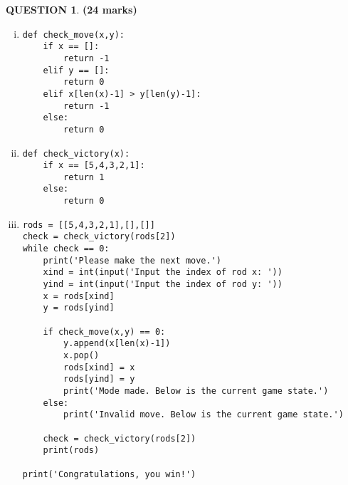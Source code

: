 \documentclass[a4paper,12pt]{article}
\theoremstyle{definition}
\newtheorem{ques}[dummy]{QUESTION}
\theoremstyle{plain}
\newcommand{\py}{python}
\begin{document}
	\begin{ques}\hfill\textbf{(24 marks)}\\
		\begin{enumerate}[(i)]
			\item 
			\begin{verbatim}
def check_move(x,y):
    if x == []:
        return -1
    elif y == []:
        return 0
    elif x[len(x)-1] > y[len(y)-1]:
        return -1
    else:
        return 0
			\end{verbatim}
			\item
			\begin{verbatim}
def check_victory(x):
    if x == [5,4,3,2,1]:
        return 1
    else:
        return 0
			\end{verbatim}
			
			\item 
			\begin{verbatim}
rods = [[5,4,3,2,1],[],[]]
check = check_victory(rods[2])
while check == 0:
    print('Please make the next move.')
    xind = int(input('Input the index of rod x: '))
    yind = int(input('Input the index of rod y: '))
    x = rods[xind]
    y = rods[yind]
    
    if check_move(x,y) == 0:
        y.append(x[len(x)-1])
        x.pop()
        rods[xind] = x
        rods[yind] = y
        print('Mode made. Below is the current game state.')
    else:
        print('Invalid move. Below is the current game state.')
    
    check = check_victory(rods[2])
    print(rods)
    
print('Congratulations, you win!')
			\end{verbatim}
		\end{enumerate}
	\end{ques}
	
	
	
	
	
	
	
	
	
	
	
	
	
	
	
	
\end{document}
